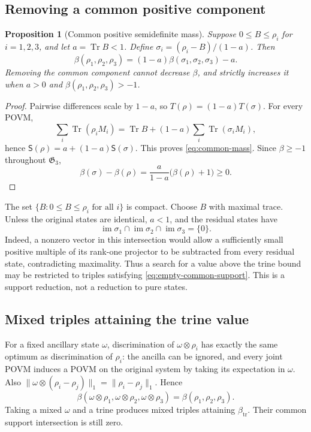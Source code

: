 \documentclass[a4paper,11pt,onecolumn,unpublished]{quantumarticle}
\newtheorem{proposition}[theorem]{Proposition}
\theoremstyle{definition}
\newcommand{\Tr}{\operatorname{Tr}}
\newcommand{\1}{\mathbf 1}
\newcommand{\Greg}{\mathfrak G}
\newcommand{\Sopt}{\mathsf S}
\newcommand{\btr}{\beta_{\mathrm{tr}}}
\begin{document}
\subsection{Removing a common positive component}

\begin{proposition}[Common positive semidefinite mass]\label{prop:common-mass}
Suppose $0\le B\le\rho_i$ for $i=1,2,3$, and let $a=\Tr B<1$. Define
$\sigma_i=(\rho_i-B)/(1-a)$. Then
\begin{equation}\label{eq:common-mass}
 \beta(\rho_1,\rho_2,\rho_3)
 =(1-a)\beta(\sigma_1,\sigma_2,\sigma_3)-a.
\end{equation}
Removing the common component cannot decrease $\beta$, and strictly increases
it when $a>0$ and $\beta(\rho_1,\rho_2,\rho_3)>-1$.
\end{proposition}
\begin{proof}
Pairwise differences scale by $1-a$, so $T(\rho)=(1-a)T(\sigma)$.
For every POVM,
\[
 \sum_i\Tr(\rho_iM_i)=\Tr B+(1-a)\sum_i\Tr(\sigma_iM_i),
\]
hence $\Sopt(\rho)=a+(1-a)\Sopt(\sigma)$. This proves
\eqref{eq:common-mass}. Since $\beta\ge-1$ throughout $\Greg_3$,
\[
 \beta(\sigma)-\beta(\rho)
 =\frac{a}{1-a}\bigl(\beta(\rho)+1\bigr)\ge0.
\]
\end{proof}

The set $\{B:0\le B\le\rho_i\text{ for all }i\}$ is compact. Choose $B$
with maximal trace. Unless the original states are identical, $a<1$, and the
residual states have
\begin{equation}\label{eq:empty-common-support}
 \operatorname{im}\sigma_1\cap\operatorname{im}\sigma_2
 \cap\operatorname{im}\sigma_3=\{0\}.
\end{equation}
Indeed, a nonzero vector in this intersection would allow a sufficiently small
positive multiple of its rank-one projector to be subtracted from every
residual state, contradicting maximality. Thus a search for a value above the
trine bound may be restricted to triples satisfying
\eqref{eq:empty-common-support}. This is a support reduction, not a reduction
to pure states.

\subsection{Mixed triples attaining the trine value}

For a fixed ancillary state $\omega$, discrimination of
$\omega\otimes\rho_i$ has exactly the same optimum as discrimination of
$\rho_i$: the ancilla can be ignored, and every joint POVM induces a POVM on
the original system by taking its expectation in $\omega$.
Also $\|\omega\otimes(\rho_i-\rho_j)\|_1=\|\rho_i-\rho_j\|_1$.
Hence
\begin{equation}\label{eq:ancilla}
 \beta(\omega\otimes\rho_1,\omega\otimes\rho_2,\omega\otimes\rho_3)
 =\beta(\rho_1,\rho_2,\rho_3).
\end{equation}
Taking a mixed $\omega$ and a trine produces mixed triples attaining $\btr$.
Their common support intersection is still zero.
\end{document}
